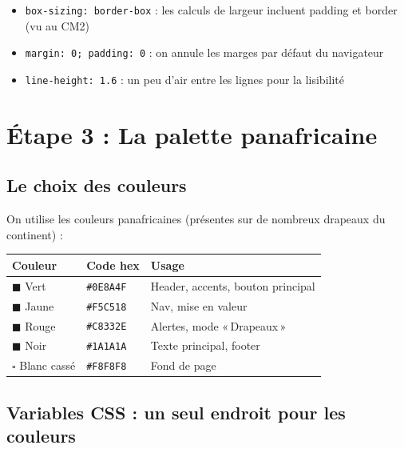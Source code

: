 \documentclass[11pt,a4paper]{article}
\begin{document}
\begin{infobox}
\begin{itemize}[nosep]
    \item \texttt{box-sizing: border-box} : les calculs de largeur incluent padding et border (vu au CM2)
    \item \texttt{margin: 0; padding: 0} : on annule les marges par défaut du navigateur
    \item \texttt{line-height: 1.6} : un peu d'air entre les lignes pour la lisibilité
\end{itemize}
\end{infobox}

\newpage

\section{Étape 3 : La palette panafricaine}

\subsection{Le choix des couleurs}

On utilise les couleurs panafricaines (présentes sur de nombreux drapeaux
du continent) :

\begin{center}
\begin{tabular}{@{}lll@{}}
\toprule
\textbf{Couleur} & \textbf{Code hex} & \textbf{Usage} \\
\midrule
\textcolor{panvert}{$\blacksquare$} Vert  & \texttt{\#0E8A4F} & Header, accents, bouton principal \\
\textcolor{panjaune}{$\blacksquare$} Jaune & \texttt{\#F5C518} & Nav, mise en valeur \\
\textcolor{panrouge}{$\blacksquare$} Rouge & \texttt{\#C8332E} & Alertes, mode «\,Drapeaux\,» \\
\textcolor{pannoir}{$\blacksquare$} Noir   & \texttt{\#1A1A1A} & Texte principal, footer \\
\textcolor{black}{$\square$} Blanc cassé   & \texttt{\#F8F8F8} & Fond de page \\
\bottomrule
\end{tabular}
\end{center}

\subsection{Variables CSS : un seul endroit pour les couleurs}
\end{document}
